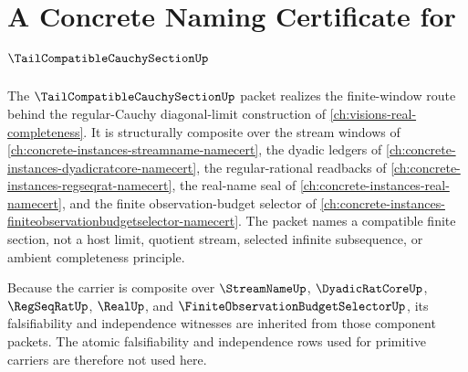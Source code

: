 \chapter{A Concrete Naming Certificate for $\TailCompatibleCauchySectionUp$}
\label{ch:concrete-instances-tailcompatiblecauchysection-namecert}

The $\TailCompatibleCauchySectionUp$ packet realizes the finite-window route behind the regular-Cauchy diagonal-limit construction of \autoref{ch:visions-real-completeness}. It is structurally composite over the stream windows of \autoref{ch:concrete-instances-streamname-namecert}, the dyadic ledgers of \autoref{ch:concrete-instances-dyadicratcore-namecert}, the regular-rational readbacks of \autoref{ch:concrete-instances-regseqrat-namecert}, the real-name seal of \autoref{ch:concrete-instances-real-namecert}, and the finite observation-budget selector of \autoref{ch:concrete-instances-finiteobservationbudgetselector-namecert}. The packet names a compatible finite section, not a host limit, quotient stream, selected infinite subsequence, or ambient completeness principle.

Because the carrier is composite over $\StreamNameUp$, $\DyadicRatCoreUp$, $\RegSeqRatUp$, $\RealUp$, and $\FiniteObservationBudgetSelectorUp$, its falsifiability and independence witnesses are inherited from those component packets. The atomic falsifiability and independence rows used for primitive carriers are therefore not used here.


